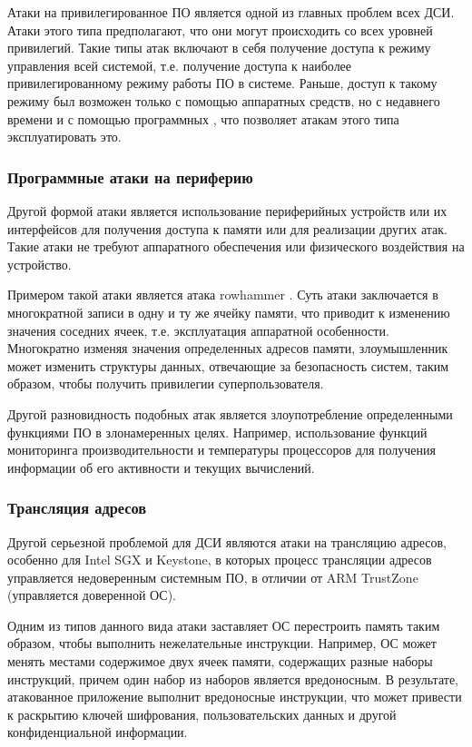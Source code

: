 Атаки на привилегированное ПО является одной из главных проблем всех ДСИ. Атаки этого типа предполагают, что они могут происходить со всех уровней привилегий. Такие типы атак включают в себя получение доступа к режиму управления всей системой, т.е. получение доступа к наиболее привилегированному режиму работы ПО в системе. Раньше, доступ к такому режиму был возможен только с помощью аппаратных средств, но с недавнего времени и с помощью программных \cite{comparsion-arm-intel}, что позволяет атакам этого типа эксплуатировать это.

\subsubsection{Программные атаки на периферию}

Другой формой атаки является использование периферийных устройств или их интерфейсов для получения доступа к памяти или для реализации других атак. Такие атаки не требуют аппаратного обеспечения или физического воздействия на устройство. 

Примером такой атаки является атака rowhammer \cite{rowhammer}. Суть атаки заключается в многократной записи в одну и ту же ячейку памяти, что приводит к изменению значения соседних ячеек, т.е. эксплуатация аппаратной особенности. Многократно изменяя значения определенных адресов памяти, злоумышленник может изменить структуры данных, отвечающие за безопасность систем, таким образом, чтобы получить привилегии суперпользователя.

Другой разновидность подобных атак является злоупотребление определенными функциями ПО в злонамеренных целях. Например, использование функций мониторинга производительности и температуры процессоров для получения информации об его активности и текущих вычислений.

\subsubsection{Трансляция адресов}

Другой серьезной проблемой для ДСИ являются атаки на трансляцию адресов, особенно для Intel SGX и Keystone, в которых процесс трансляции адресов управляется недоверенным системным ПО, в отличии от ARM TrustZone (управляется доверенной ОС).

Одним из типов данного вида атаки заставляет ОС перестроить память таким образом, чтобы выполнить нежелательные инструкции. Например, ОС может менять местами содержимое двух ячеек памяти, содержащих разные наборы инструкций, причем один набор из наборов является вредоносным. В результате, атакованное приложение выполнит вредоносные инструкции, что может привести к раскрытию ключей шифрования, пользовательских данных и другой конфиденциальной информации.


